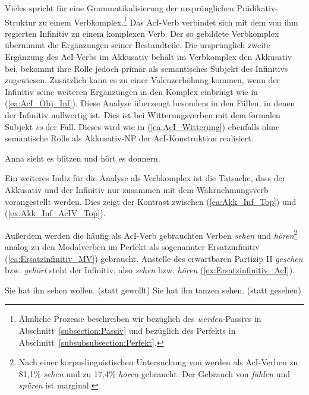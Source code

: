 Vieles spricht für eine Grammatikalisierung der ursprünglichen Prädikativ-Struktur zu einem Verbkomplex.\footnote{Ähnliche Prozesse beschreiben wir bezüglich des \textit{werden}-Passivs in Abschnitt~\ref{subsection:Passiv} und bezüglich des Perfekts in Abschnitt~\ref{subsubsubsection:Perfekt}.} Das AcI-Verb verbindet sich mit dem von ihm regierten Infinitiv zu einem komplexen Verb. Der so gebildete Verbkomplex übernimmt die Ergänzungen seiner Bestandteile. Die ursprünglich zweite Ergänzung des AcI-Verbs im Akkusativ behält im Verbkomplex den Akkusativ bei, bekommt ihre Rolle jedoch primär als semantisches Subjekt des Infinitivs zugewiesen. Zusätzlich kann es zu einer Valenzerhöhung kommen, wenn der Infinitiv seine weiteren Ergänzungen in den Komplex einbringt wie in (\ref{ea:AcI_Obj_Inf}). Diese Analyse überzeugt besonders in den Fällen, in denen der Infinitiv nullwertig ist. Dies ist bei Witterungsverben mit dem formalen Subjekt \textit{es} der Fall. Dieses wird wie in (\ref{ea:AcI_Witterung}) ebenfalls ohne semantische Rolle als Akkusativ-NP der AcI-Konstruktion realisiert.

\ea \label{ea:AcI_Witterung} Anna sieht es blitzen und hört es donnern.
\z 

Ein weiteres Indiz für die Analyse als Verbkomplex ist die Tatsache, dass der Akkusativ und der Infinitiv nur zusammen mit dem Wahrnehmungsverb vorangestellt werden. Dies zeigt der Kontrast zwischen (\ref{ea:Akk_Inf_Top}) und (\ref{ex:Akk_Inf_AcIV_Top}).

\ea \label{ea:Akk_Inf_AcI_Topikalsierung}
\label{ea:Akk_Inf_Top}
\label{ex:Akk_Inf_AcIV_Top}
\z 
\z 

Außerdem werden die häufig als AcI-Verb gebrauchten Verben \textit{sehen} und \textit{hören}\footnote{Nach einer korpuslinguistischen Untersuchung von \citet[238]{Fuss_Konopka_Woellstein2017} werden als AcI-Verben zu 81,1\% \textit{sehen} und zu 17,4\% \textit{hören} gebraucht. Der Gebrauch von \textit{fühlen} und \textit{spüren} ist marginal.} analog zu den Modalverben im Perfekt als sogenannter Ersatzinfinitiv (\ref{ea:Ersatzinfinitiv_MV}) gebraucht. Anstelle des erwartbaren Partizip II \textit{gesehen} bzw. \textit{gehört} steht der Infinitiv, also \textit{sehen} bzw. \textit{hören} (\ref{ex:Ersatzinfinitiv_AcI}).

\ea \label{ea:Ersatzinfinitiv_MV_AcI}
\ea \label{ea:Ersatzinfinitiv_MV} Sie hat ihn sehen wollen. (statt gewollt)
\ex \label{ex:Ersatzinfinitiv_AcI} Sie hat ihn tanzen sehen. (statt gesehen)
\z 
\z 

